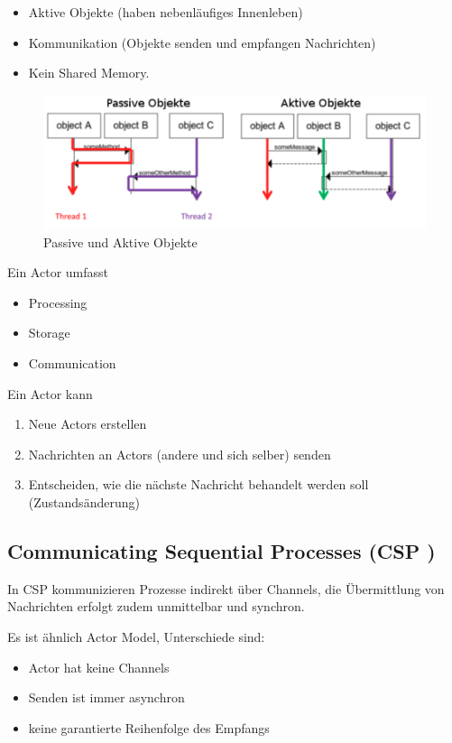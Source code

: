 \begin{itemize}
	\item Aktive Objekte (haben nebenläufiges Innenleben)
	\item Kommunikation (Objekte senden und empfangen Nachrichten)
	\item Kein Shared Memory.
\end{itemize}

\begin{figure}[h!]
	\centering
	\includegraphics[width=0.9\linewidth]{img/passive_active_objects}
	\caption{Passive und Aktive Objekte}
	\label{fig:passiveactiveobjects}
\end{figure}

Ein Actor umfasst
\begin{itemize}
	\item Processing
	\item Storage
	\item Communication
\end{itemize}

Ein Actor kann
\begin{enumerate}
	\item Neue Actors erstellen
	\item Nachrichten an Actors (andere und sich selber) senden
	\item Entscheiden, wie die nächste Nachricht behandelt werden soll (Zustandsänderung)
\end{enumerate}

\newpage

\subsection{Communicating Sequential Processes (CSP )}

In CSP kommunizieren Prozesse indirekt über Channels, die Übermittlung von Nachrichten erfolgt zudem  unmittelbar und synchron.

Es ist ähnlich Actor Model, Unterschiede sind: 
\begin{itemize}
	\item Actor hat keine Channels
	\item Senden ist immer asynchron
	\item keine garantierte Reihenfolge des Empfangs
\end{itemize}

